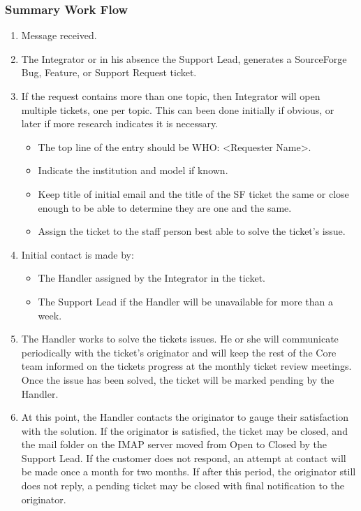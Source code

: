 \subsubsection{Summary Work Flow}
\begin{enumerate}
\item Message received.
\item The Integrator or in his absence the Support Lead, generates a SourceForge Bug, Feature, or Support Request ticket.
\item If the request contains more than one topic, then Integrator will open multiple tickets, one per topic. This can been done initially if obvious, or later if more research indicates it is necessary. 
   \begin{itemize}
   \item The top line of the entry should be WHO: <Requester Name>.
   \item Indicate the institution and model if known.
   \item Keep title of initial email and the title of the SF ticket the
same or close enough to be able to determine they are one and the same.
   \item Assign the ticket to the staff person best able to solve the ticket's issue. 
   \end{itemize}

\item Initial contact is made by:

\begin{itemize}
\item The Handler assigned by the Integrator in the ticket. 
\item The Support Lead if the Handler will be unavailable for more than a week. 
\end{itemize}

\item The Handler works to solve the tickets issues. He or she will communicate 
periodically with the ticket's originator and will keep the rest of the Core team 
informed on the tickets progress at the monthly ticket review meetings.  Once the 
issue has been solved, the ticket will be marked pending by the Handler.  

\item At this point, the Handler contacts the originator to gauge their satisfaction with
the solution. If the originator is satisfied, the ticket may be closed, and the mail 
folder on the IMAP server moved from Open to Closed by the Support Lead.  If the customer
does not respond, an attempt at contact will be made once a month for two months. 
If after this period, the originator still does not reply, a pending ticket may be closed
with final notification to the originator.   
\end{enumerate}

